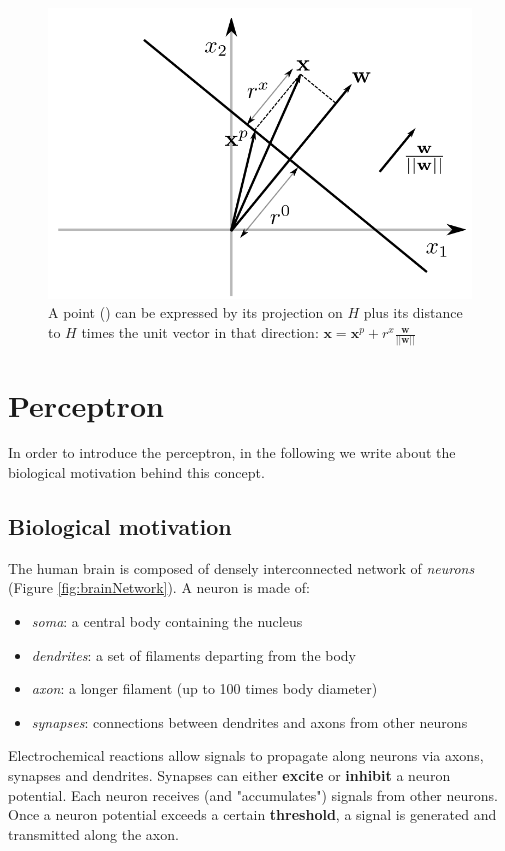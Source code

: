 \begin{figure}[H]
	\centering
	\includegraphics[scale=0.4]{
		images/12_LinearDiscriminantFunctions_geometricMargin.png
	}
	\caption{A point () can be expressed by its projection on $H$ plus its distance
	to $H$ times the unit vector in that direction:
	$\pmb{x}= \pmb{x}^{p}+ r^{x}\frac{\pmb{w}}{||\pmb{w}||}$}
	\label{fig:linearBinaryClassifier_geometricMargin}
\end{figure}

\section{Perceptron}
In order to introduce the perceptron, in the following we write about the biological
motivation behind this concept.

\subsection{Biological motivation}
The human brain is composed of densely interconnected network of \textit{neurons}
(Figure \ref{fig:brainNetwork}). A neuron is made of:
\begin{itemize}
	\item \textit{soma}: a central body containing the nucleus

	\item \textit{dendrites}: a set of filaments departing from the body

	\item \textit{axon}: a longer filament (up to 100 times body diameter)

	\item \textit{synapses}: connections between dendrites and axons from other neurons
\end{itemize}
Electrochemical reactions allow signals to propagate along neurons via axons, synapses
and dendrites. Synapses can either \textbf{excite} or \textbf{inhibit} a neuron
potential. Each neuron receives (and "accumulates") signals from other neurons.
Once a neuron potential exceeds a certain \textbf{threshold}, a signal is
generated and transmitted along the axon.

